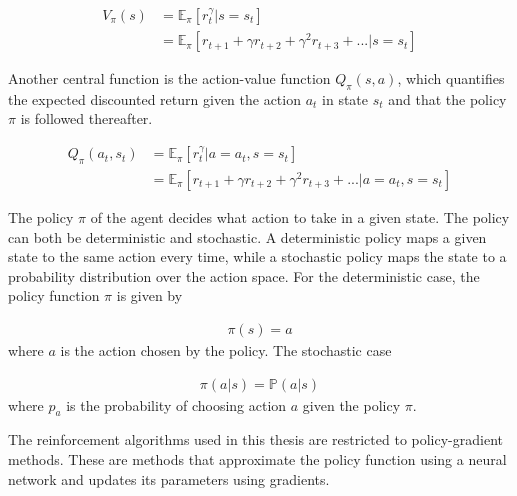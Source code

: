 \documentclass[class=book, crop=false]{standalone}
\begin{document}
\begin{equation}
   \begin{aligned}\label{eq:theory:value_function}
V_{\pi}(s) 
&= \mathbb{E}_{\pi}[r^{\gamma}_{t}| s=s_{t}]
\\
&= \mathbb{E}_{\pi}[ r_{t+1} + \gamma r_{t+2} + \gamma^{2} r_{t+3} + ...|s=s_{t}]
\end{aligned} 
\end{equation}

Another central function is the action-value function $Q_{\pi}(s,a)$, which quantifies the expected discounted return given the action $a_{t}$ in state $s_{t}$ and that the policy $\pi$ is followed thereafter. 

\begin{equation}
   \begin{aligned}\label{eq:theory:action_value_function}
Q_{\pi}(a_{t},s_{t}) 
&= \mathbb{E}_{\pi}[r^{\gamma}_{t}|a=a_{t} ,s=s_{t}]
\\
&= \mathbb{E}_{\pi}[ r_{t+1} + \gamma r_{t+2} + \gamma^{2} r_{t+3} + ...|a=a_{t} ,s=s_{t}]
\end{aligned} 
\end{equation}

The policy $\pi$ of the agent decides what action to take in a given state. The policy can both be deterministic and stochastic. A deterministic policy maps a given state to the same action every time, while a stochastic policy maps the state to a probability distribution over the action space. For the deterministic case, the policy function $\pi$ is given by


\begin{equation}
   \begin{aligned}\label{eq:theory:policy_function_deterministic}
\pi(s) = a
\end{aligned} 
\end{equation}
where $a$ is the action chosen by the policy. The stochastic case 


\begin{equation}
   \begin{aligned}\label{eq:theory:policy_function_stochastic}
\pi(a|s) = \mathbb{P}(a|s)
\end{aligned} 
\end{equation}
where $p_{a}$ is the probability of choosing action $a$ given the policy $\pi$.


The reinforcement algorithms used in this thesis are restricted to policy-gradient methods. These are methods that approximate the policy function using a neural network and updates its parameters using gradients. 
\end{document}
